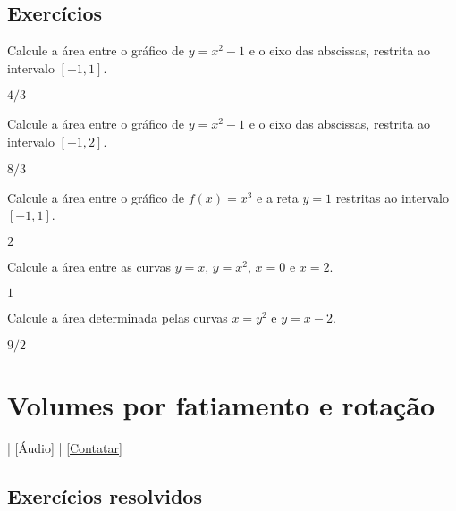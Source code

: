 \subsection{Exercícios}

\begin{exer}
  Calcule a área entre o gráfico de $y = x^2-1$ e o eixo das abscissas, restrita ao intervalo $[-1, 1]$.
\end{exer}
\begin{resp}
  $4/3$
\end{resp}

\begin{exer}
  Calcule a área entre o gráfico de $y = x^2-1$ e o eixo das abscissas, restrita ao intervalo $[-1, 2]$.
\end{exer}
\begin{resp}
  $8/3$
\end{resp}

\begin{exer}
  Calcule a área entre o gráfico de $f(x)=x^3$ e a reta $y=1$ restritas ao intervalo $[-1,1]$.
\end{exer}
\begin{resp}
  $2$
\end{resp}

\begin{exer}
  Calcule a área entre as curvas $y=x$, $y=x^2$, $x=0$ e $x=2$.
\end{exer}
\begin{resp}
  $1$
\end{resp}

\begin{exer}
  Calcule a área determinada pelas curvas $x=y^2$ e $y = x - 2$.
\end{exer}
\begin{resp}
  $9/2$
\end{resp}

\section{Volumes por fatiamento e rotação}\label{cap_apint_sec_volfat}

\begin{flushright}
  [Vídeo] | [Áudio] | \href{https://phkonzen.github.io/notas/contato.html}{[Contatar]}
\end{flushright}

\emconstrucao

\subsection{Exercícios resolvidos}

